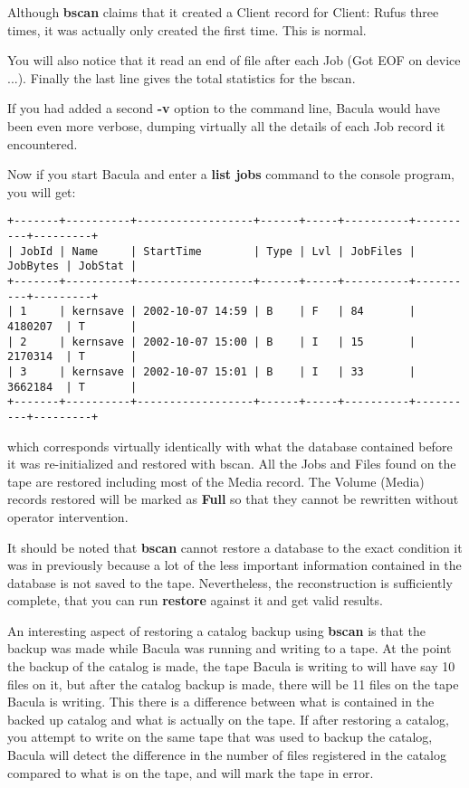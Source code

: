 Although {\bf bscan} claims that it created a Client record for Client: Rufus
three times, it was actually only created the first time. This is normal. 

You will also notice that it read an end of file after each Job (Got EOF on
device ...). Finally the last line gives the total statistics for the bscan. 

If you had added a second {\bf -v} option to the command line, Bacula would
have been even more verbose, dumping virtually all the details of each Job
record it encountered. 

Now if you start Bacula and enter a {\bf list jobs} command to the console
program, you will get: 

\footnotesize
\begin{verbatim}
+-------+----------+------------------+------+-----+----------+----------+---------+
| JobId | Name     | StartTime        | Type | Lvl | JobFiles | JobBytes | JobStat |
+-------+----------+------------------+------+-----+----------+----------+---------+
| 1     | kernsave | 2002-10-07 14:59 | B    | F   | 84       | 4180207  | T       |
| 2     | kernsave | 2002-10-07 15:00 | B    | I   | 15       | 2170314  | T       |
| 3     | kernsave | 2002-10-07 15:01 | B    | I   | 33       | 3662184  | T       |
+-------+----------+------------------+------+-----+----------+----------+---------+
\end{verbatim}
\normalsize

which corresponds virtually identically with what the database contained
before it was re-initialized and restored with bscan. All the Jobs and Files
found on the tape are restored including most of the Media record. The Volume
(Media) records restored will be marked as {\bf Full} so that they cannot be
rewritten without operator intervention. 

It should be noted that {\bf bscan} cannot restore a database to the exact
condition it was in previously because a lot of the less important information
contained in the database is not saved to the tape. Nevertheless, the
reconstruction is sufficiently complete, that you can run {\bf restore}
against it and get valid results. 

An interesting aspect of restoring a catalog backup using {\bf bscan} is
that the backup was made while Bacula was running and writing to a tape. At
the point the backup of the catalog is made, the tape Bacula is writing to
will have say 10 files on it, but after the catalog backup is made, there
will be 11 files on the tape Bacula is writing.  This there is a difference
between what is contained in the backed up catalog and what is actually on
the tape.  If after restoring a catalog, you attempt to write on the same
tape that was used to backup the catalog, Bacula will detect the difference
in the number of files registered in the catalog compared to what is on the
tape, and will mark the tape in error.  

